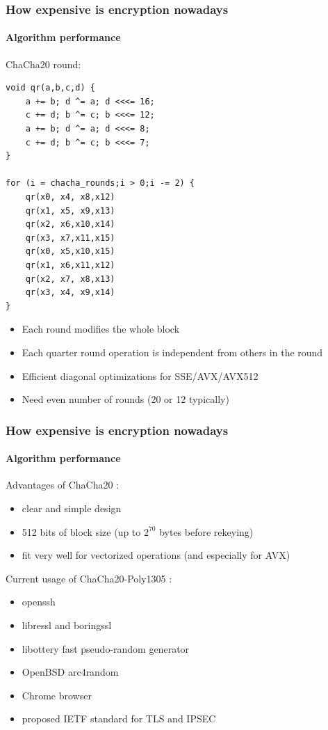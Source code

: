 \documentclass[11pt,t]{beamer}
\newcommand{\funcname}[1]{
	{\color{yellow!30} #1}
}
\newcommand{\cipher}[1]{
	{\color{blue!30} #1}
}
\begin{document}
\begin{frame}[fragile]
\frametitle{How expensive is encryption nowadays}
\framesubtitle{Algorithm performance} 
\cipher{ChaCha20} round:
\begin{tiny}
\begin{verbatim}
void qr(a,b,c,d) {
    a += b; d ^= a; d <<<= 16;
    c += d; b ^= c; b <<<= 12;
    a += b; d ^= a; d <<<= 8;
    c += d; b ^= c; b <<<= 7;
}

for (i = chacha_rounds;i > 0;i -= 2) {
    qr(x0, x4, x8,x12)
    qr(x1, x5, x9,x13)
    qr(x2, x6,x10,x14)
    qr(x3, x7,x11,x15)
    qr(x0, x5,x10,x15)
    qr(x1, x6,x11,x12)
    qr(x2, x7, x8,x13)
    qr(x3, x4, x9,x14)
}
\end{verbatim}
\end{tiny}
\begin{itemize}
\item<2-> Each round modifies the whole block
\item<2-> Each quarter round operation is independent from others in the round
\item<2-> Efficient diagonal optimizations for SSE/AVX/AVX512
\item<2-> Need even number of rounds (20 or 12 typically)
\end{itemize}
\end{frame}

\begin{frame}
\frametitle{How expensive is encryption nowadays}
\framesubtitle{Algorithm performance} 
Advantages of \cipher{ChaCha20}:
\begin{itemize}
\item clear and simple design
\item 512 bits of block size (up to $2^{70}$ bytes before rekeying)
\item fit very well for vectorized operations (and especially for AVX)
\end{itemize}
Current usage of \cipher{ChaCha20-Poly1305}:
\begin{itemize}
\item openssh
\item libressl and boringssl
\item libottery fast pseudo-random generator
\item OpenBSD \funcname{arc4random}
\item Chrome browser
\item proposed IETF standard for TLS and IPSEC
\end{itemize}
\end{frame}
\end{document}
